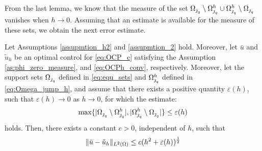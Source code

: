 {From the last lemma, we know that the measure of the set ${\Omega_{\operatorname{\jmath}_q}}\setminus  {\Omega^h_{\operatorname{\jmath}_q}}  \cup {\Omega^h_{\operatorname{\jmath}_q}}\setminus  {\Omega_{\operatorname{\jmath}_q}}  $ vanishes when $h\to 0$. Assuming that an estimate is available for the measure of these sets, we obtain the next error estimate. \begin{theorem}\label{t:error_estimate} Let Assumptions  \ref{assupmtion_h2} and \ref{assupmtion_2} hold.  Moreover, let $\bar u$  and $\tilde u_h$ be an optimal control for \eqref{eq:OCP_c} satisfying the Assumption \ref{as:phi_zero_measure}, and  \eqref{eq:OCPh_conv}, respectively.
Moreover, let the support sets $\Omega_{\operatorname{\jmath}_q}$ defined in  \eqref{eq:equ_sets} and $\Omega_{\operatorname{\jmath}_q}^h$ defined in \eqref{eq:Omega_jump_h}, and assume that there exists a positive quantity $\varepsilon(h)$, such that $\varepsilon(h)\to 0$ as $h\to 0$, for which the estimate:
\begin{equation}\label{eq:theorem_7_assu}
\max\{|{\Omega_{\operatorname{\jmath}_q}}\setminus  {\Omega^h_{\operatorname{\jmath}_q}} | , |{\Omega^h_{\operatorname{\jmath}_q}}\setminus  {\Omega_{\operatorname{\jmath}_q}}  | \}\le \varepsilon(h) 
\end{equation}
holds. Then, there exists a constant $c>0$, independent of $h$, such that 
\[
\lVert \bar u-\tilde u_h \rVert_{L^2(\Omega)}\le c({h^2}+\varepsilon(h))^{\frac{1}{2}} 
\]
\end{theorem}

}
